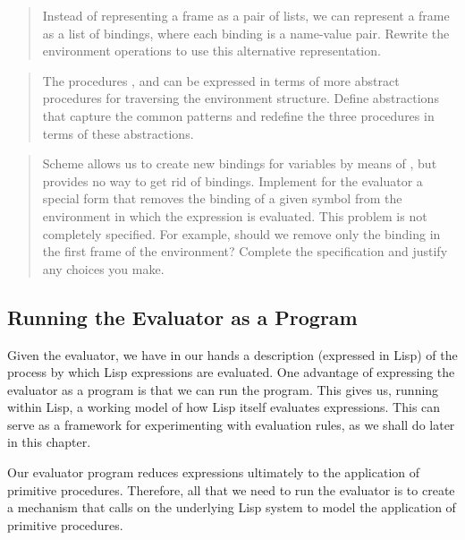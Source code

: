 \begin{quote}
 Instead of representing a frame
as a pair of lists, we can represent a frame as a list of bindings, where each
binding is a name-value pair.  Rewrite the environment operations to use this
alternative representation.
\end{quote}

\begin{quote}
 The procedures
,  and
 can be expressed in terms of more abstract
procedures for traversing the environment structure.  Define abstractions that
capture the common patterns and redefine the three procedures in terms of these
abstractions.
\end{quote}

\begin{quote}
 Scheme allows us to create new
bindings for variables by means of , but provides no way to get
rid of bindings.  Implement for the evaluator a special form
 that removes the binding of a given symbol from the
environment in which the  expression is evaluated.  This
problem is not completely specified.  For example, should we remove only the
binding in the first frame of the environment?  Complete the specification and
justify any choices you make.
\end{quote}

\subsection{Running the Evaluator as a Program}
\label{Section 4.1.4}

Given the evaluator, we have in our hands a description (expressed in Lisp) of
the process by which Lisp expressions are evaluated.  One advantage of
expressing the evaluator as a program is that we can run the program.  This
gives us, running within Lisp, a working model of how Lisp itself evaluates
expressions.  This can serve as a framework for experimenting with evaluation
rules, as we shall do later in this chapter.

Our evaluator program reduces expressions ultimately to the application of
primitive procedures.  Therefore, all that we need to run the evaluator is to
create a mechanism that calls on the underlying Lisp system to model the
application of primitive procedures.

